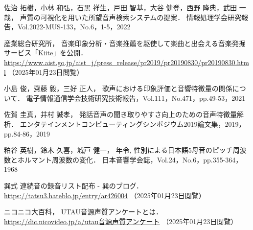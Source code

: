 \begin{thebibliography}{参考文献}
佐治 拓樹，小林 和弘，石黒 祥生，戸田 智基，大谷 健登，西野 隆典，武田 一哉，
声質の可視化を用いた所望音声検索システムの提案．
情報処理学会研究報告，Vol.2022-MUS-133，No.6，1-5，2022

産業総合研究所，
音楽印象分析・音楽推薦を駆使して楽曲と出会える音楽発掘サービス「Kiite」を公開．
\url{https://www.aist.go.jp/aist_j/press_release/pr2019/pr20190830/pr20190830.html}
（2025年01月23日閲覧）

小島 俊，齋藤 毅，三好 正人，
歌声における印象評価と音響特徴量の関係について．
電子情報通信学会技術研究技術報告，Vol.111，No.471，pp.49-53，2021

佐賀 圭真，井村 誠孝，
発話音声の聞き取りやすさ向上のための音声特徴量解析．
エンタテインメントコンピューティングシンポジウム2019論文集，2019，pp.84-86，2019

粕谷 英樹，鈴木 久喜，城戸 健一，
年令, 性別による日本語5母音のピッチ周波数とホルマント周波数の変化．
日本音響学会誌，Vol.24，No.6，pp.355-364，1968

巽式 連続音の録音リスト配布 - 巽のブログ．
\url{https://tatsu3.hateblo.jp/entry/ar426004}
（2025年01月23日閲覧）

ニコニコ大百科，
UTAU音源声質アンケートとは．
\url{https://dic.nicovideo.jp/a/utau音源声質アンケート}
（2025年01月23日閲覧）

\end{thebibliography}
